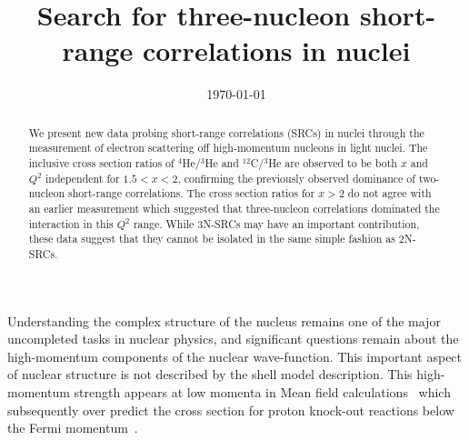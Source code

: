 \documentclass[aps,prl,superscriptaddress,showpacs,twocolumn,floatfix,amsmath,amssymb]{revtex4-1}
\begin{document}
\title{Search for three-nucleon short-range correlations in nuclei}



\date{\today}

\begin{abstract}

We present new data probing short-range correlations (SRCs) in nuclei through the measurement of electron scattering off high-momentum nucleons in
light nuclei. The inclusive cross section ratios of $^4$He/$^3$He and $^{12}$C/$^3$He are observed to be both $x$ and $Q^2$ independent
for $1.5 < x <2$, confirming the previously observed dominance of two-nucleon short-range correlations. The cross section ratios for
$x > 2$ do not agree with an earlier measurement which suggested that three-nucleon correlations dominated the interaction in this $Q^2$ range.
While 3N-SRCs may have an important contribution, these data suggest that they cannot be isolated in the same simple fashion as 2N-SRCs.

\end{abstract}

\maketitle

%
Understanding the complex structure of the nucleus remains one of the major uncompleted tasks in nuclear physics, and significant questions remain about the high-momentum components of the nuclear wave-function. This important aspect of nuclear structure is not described by the shell model description. This high-momentum strength appears at low momenta in Mean field calculations~\cite{DeForest1983} which subsequently over predict the cross section for proton knock-out reactions below the Fermi momentum~\cite{VanDerSteenhoven1988547, Lapikas1993297, Kelly:1996hd}.

\end{document}
